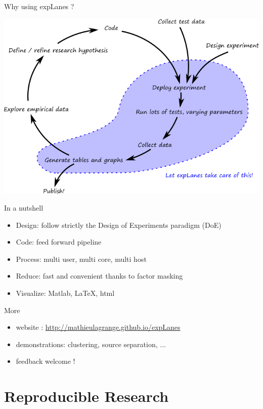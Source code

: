 \documentclass[compress]{beamer}
\begin{document}
\begin{frame}{Why using expLanes ?}
\begin{center}
\includegraphics[width=.9\columnwidth]{figures/workflow} \\
\end{center}
\end{frame}

\begin{frame}{In a nutshell}
\begin{itemize}
\item Design: follow strictly the Design of Experiments paradigm (DoE)
\item Code: feed forward pipeline
\item Process: multi user, multi core, multi host
\item Reduce: fast and convenient thanks to factor masking
\item Visualize: Matlab, \LaTeX, html
\end{itemize}
\end{frame}

\begin{frame}{More}
\begin{itemize}
\item website : \url{http://mathieulagrange.github.io/expLanes}
\item demonstrations: clustering, source separation, ...
\item feedback welcome !
\end{itemize}
\end{frame}

\section{Reproducible Research}
\end{document}
